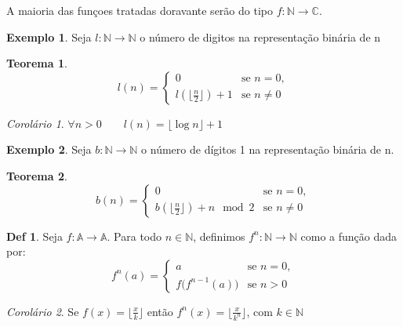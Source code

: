 \documentclass[a4paper,11pt]{article}
\theoremstyle{definition} \newtheorem{definicao}{Def}
\theoremstyle{definition} \newtheorem{exemplo}{Exemplo}
\theoremstyle{plain}      \newtheorem{teorema}{Teorema}
\theoremstyle{remark}     \newtheorem*{corolario}{Corol\'{a}rio}
\begin{document}
A maioria das fun\c{c}oes tratadas doravante ser\~{a}o do tipo
$f: \mathbb{N} \longrightarrow \mathbb{C}$.

\begin{exemplo}
Seja $l: \mathbb{N} \longrightarrow \mathbb{N}$ o n\'{u}mero de
digitos na representa\c{c}\~{a}o bin\'{a}ria de n
\end{exemplo}

\begin{teorema}
\begin{equation*}
l(n) =
\begin{cases}
0 & \text{se } n = 0, \\
l(\lfloor \frac{n}{2} \rfloor) + 1 & \text{se } n \neq 0
\end{cases}
\end{equation*}
\end{teorema}

\begin{corolario}
$\forall n > 0 \qquad l(n) = \lfloor \log n \rfloor + 1 $
\end{corolario}

\begin{exemplo}
Seja $b: \mathbb{N} \longrightarrow \mathbb{N}$ o n\'{u}mero de
d\'{i}gitos 1 na representa\c{c}\~{a}o bin\'{a}ria de n.
\end{exemplo}

\begin{teorema}
\begin{equation*}
b(n) =
\begin{cases}
0 & \text{se } n = 0, \\
b(\lfloor \frac{n}{2} \rfloor) + n \mod 2 & \text{se } n \neq 0
\end{cases}
\end{equation*}
\end{teorema}

\begin{definicao}
Seja $f: \mathbb{A} \longrightarrow \mathbb{A}$. Para todo
$n \in \mathbb{N}$, definimos $f^n: \mathbb{N} \longrightarrow \mathbb{N}$
como a fun\c{c}\~{a}o dada por:
\begin{equation*}
f^n(a) =
\begin{cases}
a & \text{se } n = 0, \\
f\Big(f^{n-1}(a)\Big) & \text{se } n > 0
\end{cases}
\end{equation*}
\end{definicao}

\begin{corolario}
Se $f(x) = \lfloor \frac{x}{k} \rfloor$ ent\~{a}o
$f^n(x) = \lfloor \frac{x}{k^n} \rfloor$, com $k \in \mathbb{N}$
\end{corolario}
\end{document}
